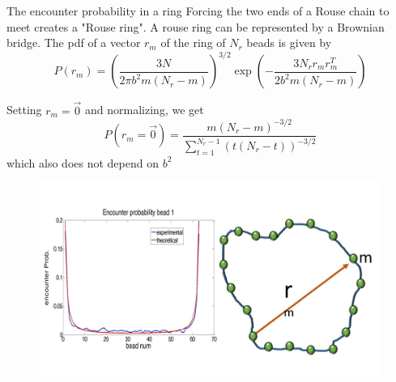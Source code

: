 \documentclass[8pt]{beamer}
\begin{document}
\begin{frame}{The encounter probability in a ring}
Forcing the two ends of a Rouse chain to meet creates a "Rouse ring". 
A rouse ring can be represented by a Brownian bridge.
The pdf of a vector $r_{m}$ of the ring of $N_r$ beads is given by 
\begin{equation*}
P(r_m)=\left(\frac{3N}{2\pi b^2 m(N_r-m)} \right)^{3/2}\exp\left(-\frac{3N_rr_mr_m^T}{2b^2m(N_r-m)}\right)
\end{equation*}

Setting $r_m=\vec{0}$ and normalizing, we get 
\begin{equation*}
P(r_m=\vec{0})=\frac{m(N_r-m)^{-3/2}}{\sum_{t=1}^{N_r-1}(t(N_r-t))^{-3/2}}
\end{equation*}
which also does not depend on $b^2$ 
\begin{figure}[H]
\includegraphics[scale=0.2]{rouseRingVectorBetween0AndM}
\end{figure}
\end{frame}
\end{document}
